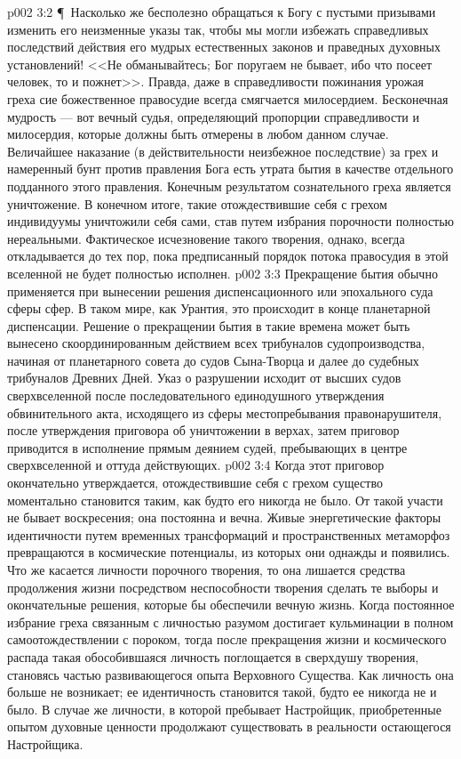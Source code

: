 \vs p002 3:2 \P\ Насколько же бесполезно обращаться к Богу с пустыми призывами изменить его неизменные указы так, чтобы мы могли избежать справедливых последствий действия его мудрых естественных законов и праведных духовных установлений! <<Не обманывайтесь; Бог поругаем не бывает, ибо что посеет человек, то и пожнет>>. Правда, даже в справедливости пожинания урожая греха сие божественное правосудие всегда смягчается милосердием. Бесконечная мудрость --- вот вечный судья, определяющий пропорции справедливости и милосердия, которые должны быть отмерены в любом данном случае. Величайшее наказание (в действительности неизбежное последствие) за грех и намеренный бунт против правления Бога есть утрата бытия в качестве отдельного подданного этого правления. Конечным результатом сознательного греха является уничтожение. В конечном итоге, такие отождествившие себя с грехом индивидуумы уничтожили себя сами, став путем избрания порочности полностью нереальными. Фактическое исчезновение такого творения, однако, всегда откладывается до тех пор, пока предписанный порядок потока правосудия в этой вселенной не будет полностью исполнен.
\vs p002 3:3 Прекращение бытия обычно применяется при вынесении решения диспенсационного или эпохального суда сферы сфер. В таком мире, как Урантия, это происходит в конце планетарной диспенсации. Решение о прекращении бытия в такие времена может быть вынесено скоординированным действием всех трибуналов судопроизводства, начиная от планетарного совета до судов Сына\hyp{}Творца и далее до судебных трибуналов Древних Дней. Указ о разрушении исходит от высших судов сверхвселенной после последовательного единодушного утверждения обвинительного акта, исходящего из сферы местопребывания правонарушителя, после утверждения приговора об уничтожении в верхах, затем приговор приводится в исполнение прямым деянием судей, пребывающих в центре сверхвселенной и оттуда действующих.
\vs p002 3:4 Когда этот приговор окончательно утверждается, отождествившие себя с грехом существо моментально становится таким, как будто его никогда не было. От такой участи не бывает воскресения; она постоянна и вечна. Живые энергетические факторы идентичности путем временных трансформаций и пространственных метаморфоз превращаются в космические потенциалы, из которых они однажды и появились. Что же касается личности порочного творения, то она лишается средства продолжения жизни посредством неспособности творения сделать те выборы и окончательные решения, которые бы обеспечили вечную жизнь. Когда постоянное избрание греха связанным с личностью разумом достигает кульминации в полном самоотождествлении с пороком, тогда после прекращения жизни и космического распада такая обособившаяся личность поглощается в сверхдушу творения, становясь частью развивающегося опыта Верховного Существа. Как личность она больше не возникает; ее идентичность становится такой, будто ее никогда не и было. В случае же личности, в которой пребывает Настройщик, приобретенные опытом духовные ценности продолжают существовать в реальности остающегося Настройщика.
